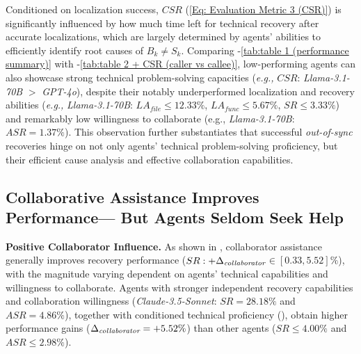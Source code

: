Conditioned on localization success, $CSR$ (\eqref{Eq: Evaluation Metric 3 (CSR)}) is significantly influenced by how much time left for technical recovery after accurate localizations, which are largely determined by agents' abilities to efficiently identify root causes of $B_k \neq S_k$.
Comparing -\ref{tab:table 1 (performance summary)} with -\ref{tab:table 2 + CSR (caller vs callee)}, low-performing agents can also showcase strong technical problem-solving capacities (\textit{e.g.,} $CSR$: \textit{Llama-3.1-70B} $>$ \textit{GPT-4o}), despite their notably underperformed localization and recovery abilities (\textit{e.g.,} \textit{Llama-3.1-70B}: $LA_{file} \leq 12.33\%$, $LA_{func} \leq 5.67\%$, $SR \leq 3.33\%$) and remarkably low willingness to collaborate (e.g., \textit{Llama-3.1-70B}: $ASR=1.37\%$).
This observation further substantiates that successful \textit{out-of-sync} recoveries hinge on not only agents' technical problem-solving proficiency, but their efficient cause analysis and effective collaboration capabilities.







\subsection{Collaborative Assistance Improves Performance---
But Agents Seldom Seek Help
}
\label{Section: Beneficial Collaborator Influence Limited By Disadvantageous Agent Initiative}



\textbf{Positive Collaborator Influence.}
As shown in , collaborator assistance generally improves recovery performance ($SR: +\Delta_{\textit{\text{collaborator}}}$$\in$$[0.33, 5.52]\%$), with the magnitude varying dependent on agents' technical capabilities and willingness to collaborate.
Agents with stronger independent recovery capabilities and collaboration willingness (\textit{Claude-3.5-Sonnet}: $SR=28.18\%$ and $ASR=4.86\%$), together with conditioned technical proficiency (), obtain higher performance gains ($\Delta_{\textit{\text{collaborator}}}=+5.52\%$) than other agents ($SR \leq 4.00\%$ and $ASR \leq 2.98\%$). 



